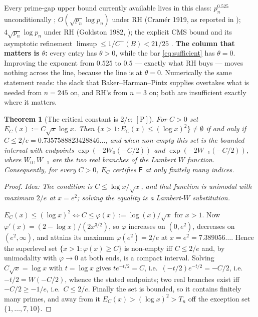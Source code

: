 \documentclass[11pt,a4paper]{article}
\theoremstyle{plain}
\newtheorem{theorem}{Theorem}[section]
\theoremstyle{definition}
\theoremstyle{remark}
\newcommand{\idea}[1]{\emph{Idea: #1}\par\smallskip}
\newcommand{\cP}{{[\mathrm{P}]}}
\newcommand{\Fb}{\mathsf{F}}
\begin{document}
Every prime-gap upper bound currently available lives in this class:
$p_n^{0.525}$ unconditionally \cite{baker2001difference}; $O(\sqrt{p_n}\log p_n)$ under RH
(Cram\'er 1919, as reported in \cite[\S2, Thm.~4]{visser2018andrica}); $4\sqrt{p_n}\log p_n$
under RH (Goldston 1982, \cite[\S2, Thm.~5]{visser2018andrica}); the explicit CMS bound and
its asymptotic refinement $\limsup \le 1/C^+(B) < 21/25$
\cite[\S1.2, Cor.~4]{carneiro2019fourier}. \textbf{The column that matters is $\theta$:} every
entry has $\theta > 0$, while the bar \eqref{eq:sufficient} has $\theta = 0$. Improving the
exponent from $0.525$ to $0.5$ --- exactly what RH buys --- moves nothing across the line,
because the line is at $\theta = 0$. Numerically the same statement reads: the slack that
Baker--Harman--Pintz supplies overtakes what is needed from $n = 245$ on, and RH's from
$n = 3$ on; both are insufficient exactly where it matters.

\begin{theorem}[The critical constant is $2/e$; $\cP$]
\label{thm:Ccrit}
For $C > 0$ set $E_C(x) := C\sqrt{x}\log x$. Then
$\{x > 1 : E_C(x) \le (\log x)^2\} \ne \emptyset$ if and only if
$C \le 2/e = 0.7357588823428846\ldots$, and when non-empty this set is the \emph{bounded}
interval with endpoints $\exp(-2W_0(-C/2))$ and $\exp(-2W_{-1}(-C/2))$, where $W_0, W_{-1}$ are
the two real branches of the Lambert $W$ function. Consequently, for every $C > 0$, $E_C$
certifies $\Fb$ at only finitely many indices.
\end{theorem}

\begin{proof}
\idea{The condition is $C \le \log x/\sqrt{x}$, and that function is unimodal with maximum
$2/e$ at $x = e^2$; solving the equality is a Lambert-$W$ substitution.}
$E_C(x) \le (\log x)^2 \iff C \le \varphi(x) := \log(x)/\sqrt{x}$ for $x > 1$. Now
$\varphi'(x) = (2 - \log x)/(2x^{3/2})$, so $\varphi$ increases on $(0,e^2)$, decreases on
$(e^2,\infty)$, and attains its maximum $\varphi(e^2) = 2/e$ at $x = e^2 = 7.389056\ldots$.
Hence the superlevel set $\{x > 1 : \varphi(x) \ge C\}$ is non-empty iff $C \le 2/e$ and, by
unimodality with $\varphi \to 0$ at both ends, is a compact interval. Solving
$C\sqrt{x} = \log x$ with $t = \log x$ gives $te^{-t/2} = C$, i.e.\
$(-t/2)e^{-t/2} = -C/2$, i.e.\ $-t/2 = W(-C/2)$, whence the stated endpoints; two real
branches exist iff $-C/2 \ge -1/e$, i.e.\ $C \le 2/e$. Finally the set is bounded, so it
contains finitely many primes, and away from it $E_C(x) > (\log x)^2 > T_n$ off the exception
set $\{1,\dots,7,10\}$.
\end{proof}
\end{document}
